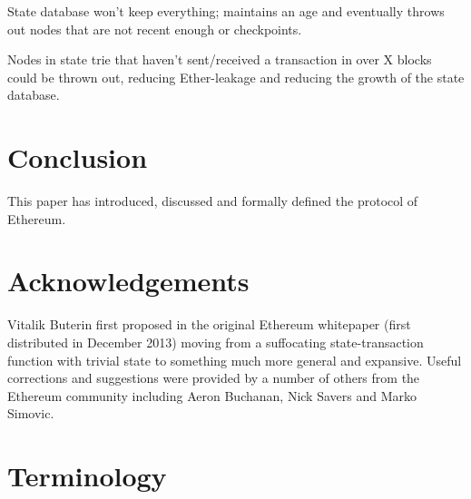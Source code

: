 \documentclass[9pt,oneside]{amsart}
\begin{document}
\begin{multicols}{2}
State database won't keep everything; maintains an age and eventually throws out nodes that are not recent enough or checkpoints.

Nodes in state trie that haven't sent/received a transaction in over X blocks could be thrown out, reducing Ether-leakage and reducing the growth of the state database.

\section{Conclusion} \label{ch:conclusion}

This paper has introduced, discussed and formally defined the protocol of Ethereum.

\section{Acknowledgements}

Vitalik Buterin first proposed in the original Ethereum whitepaper (first distributed in December 2013) moving from a suffocating state-transaction function with trivial state to something much more general and expansive. Useful corrections and suggestions were provided by a number of others from the Ethereum community including Aeron Buchanan, Nick Savers and Marko Simovic.




\end{multicols}

\appendix

\section{Terminology}
\end{document}
